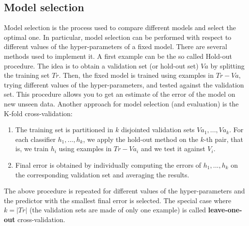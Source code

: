 \subsection{Model selection}
Model selection is the process used to compare different models and select the optimal one. In particular, model selection can be performed with respect to different values of the hyper-parameters of a fixed model.\newline\newline
There are several methods used to implement it. A first example can be the so called Hold-out procedure. The idea is to obtain a validation set (or hold-out set) $Va$ by splitting the training set $Tr$. Then, the fixed model is trained using examples in $Tr - Va$, trying different values of the hyper-parameters, and tested against the validation set. This procedure allows you to get an estimate of the error of the model on new unseen data.\newline\newline
Another approach for model selection (and evaluation) is the K-fold cross-validation:
\begin{enumerate}
    \item The training set is partitioned in $k$ disjointed validation sets $Va_{1},...,Va_{k}$. For each classifier $h_{1},...,h_{k}$, we apply the hold-out method on the $k$-th pair, that is, we train $h_{i}$ using examples in $Tr - Va_{i}$ and we test it against $V_{i}$. 

    \item Final error is obtained by individually computing the errors of $h_{1},...,h_{k}$ on the corresponding validation set and averaging the results.
\end{enumerate}
The above procedure is repeated for different values of the hyper-parameters and the predictor with the smallest final error is selected. The special case where $k = |Tr|$ (the validation sets are made of only one example) is called \textbf{leave-one-out} cross-validation.

